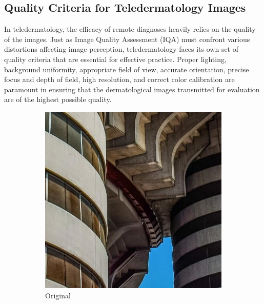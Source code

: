 \subsection{Quality Criteria for Teledermatology Images}
\label{sub:QualityCriteriaTeledermatology}
In teledermatology, the efficacy of remote diagnoses heavily relies on the quality of the images. Just as Image Quality Assessment (IQA) must confront various distortions affecting image perception, teledermatology faces its own set of quality criteria that are essential for effective practice. Proper lighting, background uniformity, appropriate field of view, accurate orientation, precise focus and depth of field, high resolution, and correct color calibration are paramount in ensuring that the dermatological images transmitted for evaluation are of the highest possible quality.
\begin{figure}[ht]
    \centering
    \begin{subfigure}[b]{0.24\textwidth}
        \includegraphics[width=\textwidth]{img/Original.jpg}
        \caption{Original}
    \end{subfigure}
    \hfill
    \begin{subfigure}[b]{0.24\textwidth}

\end{subfigure}
\end{figure}
